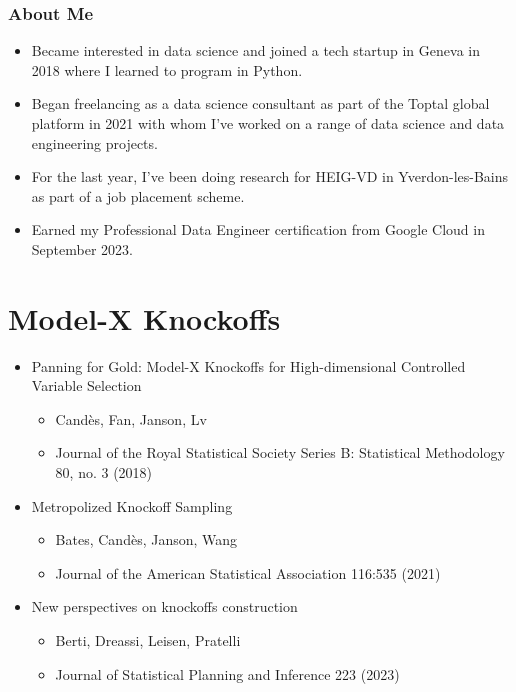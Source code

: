 \documentclass[
	11pt, %
]{beamer}
\begin{document}
\begin{frame}
	\frametitle{About Me}
	
	\begin{itemize}
		\item Became interested in data science and joined a tech startup in Geneva in 2018 where I learned to program in Python.
		\item Began freelancing as a data science consultant as part of the Toptal global platform in 2021 with whom I've worked on a range of data science and data engineering projects.
		\item For the last year, I've been doing research for HEIG-VD in Yverdon-les-Bains as part of a job placement scheme.
		\item Earned my Professional Data Engineer certification from Google Cloud in September 2023. 
	\end{itemize}
\end{frame}

\section{Model-X Knockoffs}

\begin{frame}
	\begin{itemize}
		\item Panning for Gold: Model-X Knockoffs for High-dimensional Controlled Variable Selection
		\begin{itemize}
			\item Cand\`{e}s, Fan, Janson, Lv
			\item Journal of the Royal Statistical Society Series B: Statistical Methodology 80, no. 3 (2018)
		\end{itemize}
		\bigskip
		\item Metropolized Knockoff Sampling
		\begin{itemize}
			\item Bates, Cand\`{e}s, Janson, Wang
			\item Journal of the American Statistical Association 116:535 (2021)
		\end{itemize}
		\bigskip
		\item New perspectives on knockoffs construction
		\begin{itemize}
			\item Berti, Dreassi, Leisen, Pratelli
			\item Journal of Statistical Planning and Inference 223 (2023)
		\end{itemize}
	\end{itemize}
\end{frame}
\end{document}
